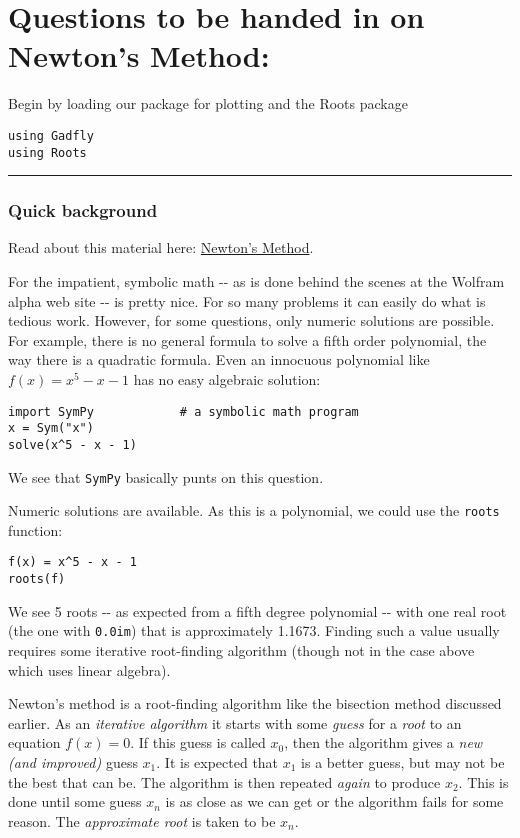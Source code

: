 \documentclass[12pt]{article}
\begin{document}
\section{Questions to be handed in on Newton's Method:}

Begin by loading our package for plotting and the Roots package



\begin{verbatim}
using Gadfly            
using Roots
\end{verbatim}
\begin{center}\rule{3in}{0.4pt}\end{center}

\subsubsection{Quick background}

Read about this material here:
\href{http://mth229.github.io/newton.html}{Newton's Method}.

For the impatient, symbolic math -{}- as is done behind the scenes at
the Wolfram alpha web site -{}- is pretty nice. For so many problems it
can easily do what is tedious work. However, for some questions, only
numeric solutions are possible. For example, there is no general formula
to solve a fifth order polynomial, the way there is a quadratic formula.
Even an innocuous polynomial like $f(x) = x^5 - x - 1$ has no easy
algebraic solution:



\begin{verbatim}
import SymPy            # a symbolic math program
x = Sym("x")
solve(x^5 - x - 1)
\end{verbatim}
We see that \texttt{SymPy} basically punts on this question.

Numeric solutions are available. As this is a polynomial, we could use
the \texttt{roots} function:



\begin{verbatim}
f(x) = x^5 - x - 1
roots(f)
\end{verbatim}
We see 5 roots -{}- as expected from a fifth degree polynomial -{}- with
one real root (the one with \texttt{0.0im}) that is approximately
1.1673. Finding such a value usually requires some iterative
root-finding algorithm (though not in the case above which uses linear
algebra).

Newton's method is a root-finding algorithm like the bisection method
discussed earlier. As an \emph{iterative algorithm} it starts with some
\emph{guess} for a \emph{root} to an equation $f(x) = 0$. If this guess
is called $x_0$, then the algorithm gives a \emph{new (and improved)}
guess $x_1$. It is expected that $x_1$ is a better guess, but may not be
the best that can be. The algorithm is then repeated \emph{again} to
produce $x_2$. This is done until some guess $x_n$ is as close as we can
get or the algorithm fails for some reason. The \emph{approximate root}
is taken to be $x_n$.
\end{document}
